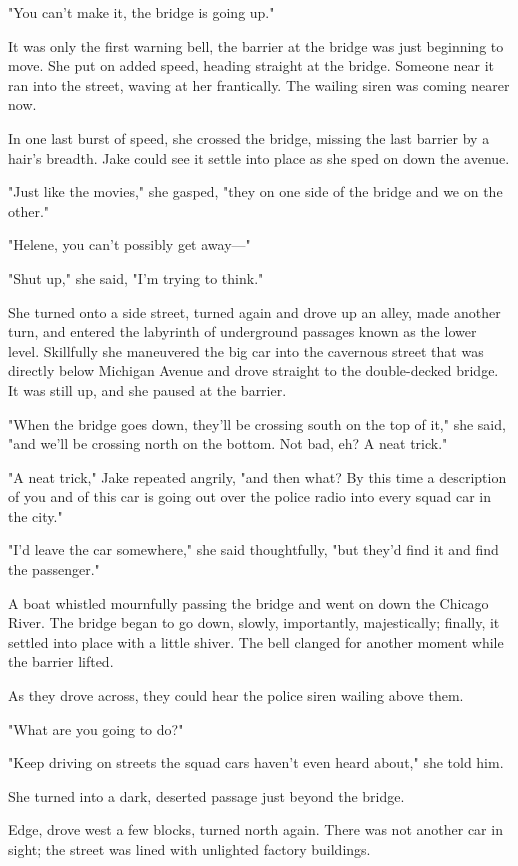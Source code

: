 \documentclass{novel}
\begin{document}
"You can't make it, the bridge is going up."

It was only the first warning bell, the barrier at the bridge was just beginning to move. She put on added speed, heading straight at the bridge. Someone near it ran into the street, waving at her frantically. The wailing siren was coming nearer now.

In one last burst of speed, she crossed the bridge, missing the last barrier by a hair's breadth. Jake could see it settle into place as she sped on down the avenue.

"Just like the movies," she gasped, "they on one side of the bridge and we on the other."

"Helene, you can't possibly get away—"

"Shut up," she said, "I'm trying to think."

She turned onto a side street, turned again and drove up an alley, made another turn, and entered the labyrinth of underground passages known as the lower level. Skillfully she maneuvered the big car into the cavernous street that was directly below Michigan Avenue and drove straight to the double-decked bridge. It was still up, and she paused at the barrier.

"When the bridge goes down, they'll be crossing south on the top of it," she said, "and we'll be crossing north on the bottom. Not bad, eh? A neat trick."

"A neat trick," Jake repeated angrily, "and then what? By this time a description of you and of this car is going out over the police radio into every squad car in the city."

"I'd leave the car somewhere," she said thoughtfully, "but they'd find it and find the passenger."

A boat whistled mournfully passing the bridge and went on down the Chicago River. The bridge began to go down, slowly, importantly, majestically; finally, it settled into place with a little shiver. The bell clanged for another moment while the barrier lifted.

As they drove across, they could hear the police siren wailing above them.

"What are you going to do?"

"Keep driving on streets the squad cars haven't even heard about," she told him.

She turned into a dark, deserted passage just beyond the bridge.

Edge, drove west a few blocks, turned north again. There was not another car in sight; the street was lined with unlighted factory buildings.
\end{document}
